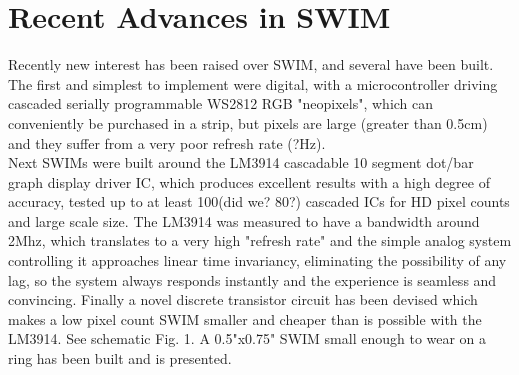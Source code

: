 \documentclass[conference]{IEEEtran}
\begin{document}
\section{Recent Advances in SWIM}
Recently new interest has been raised over SWIM, and several have been built.
The first and simplest to implement were digital, with a microcontroller driving cascaded serially programmable WS2812 RGB "neopixels", which can conveniently be purchased in a strip, but pixels are large (greater than 0.5cm) and they suffer from a very poor refresh rate (?Hz). \\
Next SWIMs were built around the LM3914 cascadable 10 segment dot/bar graph display driver IC, which produces excellent results with a high degree of accuracy, tested up to at least 100(did we? 80?) cascaded ICs for HD pixel counts and large scale size.
The LM3914 was measured to have a bandwidth around 2Mhz, which translates to a very high "refresh rate" and the simple analog system controlling it approaches linear time invariancy, eliminating the possibility of any lag, so the system always responds instantly and the experience is seamless and convincing.
Finally a novel discrete transistor circuit has been devised which makes a low pixel count SWIM smaller and cheaper than is possible with the LM3914. See schematic Fig. 1. A 0.5"x0.75" SWIM small enough to wear on a ring has been built and is presented. 
  
%
\end{document}
